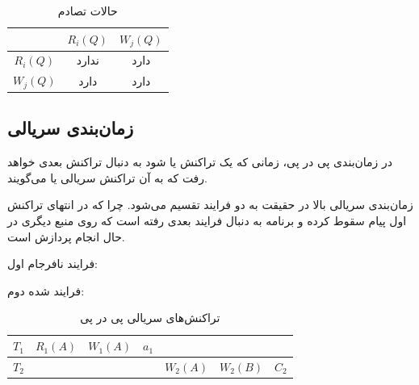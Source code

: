 \documentclass[20pt, a4paper]{article}
\begin{document}
\begin{LTR}
    \begin{table}[h]
        \centering
        \begin{RTL}
            \caption{حالات تصادم}
        \end{RTL}
        \begin{tabular}{|c|c|c|}
            \hline
            & $R_{i}(Q)$ & $W_{j}(Q)$ \\ \hline
            $R_{i}(Q)$ & ندارد &  دارد  \\ \hline
            $W_{j}(Q)$ & دارد & دارد  \\ \hline
        \end{tabular}
    \end{table}
\end{LTR}

\subsection{زمان‌بندی سریالی}

در زمان‌بندی پی در پی، زمانی که یک تراکنش  یا  شود به دنبال
تراکنش بعدی خواهد رفت که به آن تراکنش سریالی یا 
می‌گویند.

\begin{LTR}
\end{LTR}

زمان‌بندی سریالی بالا در حقیقت به دو فرایند تقسیم می‌شود. چرا که در انتهای
تراکنش اول پیام سقوط کرده و برنامه به دنبال فرایند بعدی رفته است که روی منبع
دیگری در حال انجام پردازش است.

فرایند نافرجام اول:

\begin{LTR}
\end{LTR}

فرایند  شده دوم:

\begin{LTR}
\end{LTR}

\begin{LTR}
    \begin{table}[h]
        \centering
        \begin{RTL}
            \caption{تراکنش‌های سریالی پی در پی}
        \end{RTL}
        \begin{tabular}{|c|c|c|c|c|c|c|}
            \hline
            $T_{1}$ & $R_{1}(A)$ & $W_{1}(A)$ & $a_{1}$ & & & \\ \hline
            $T_{2}$ & & & & $W_{2}(A)$ & $W_{2}(B)$ & $C_{2}$ \\ \hline
        \end{tabular}
    \end{table}
\end{LTR}
\end{document}
